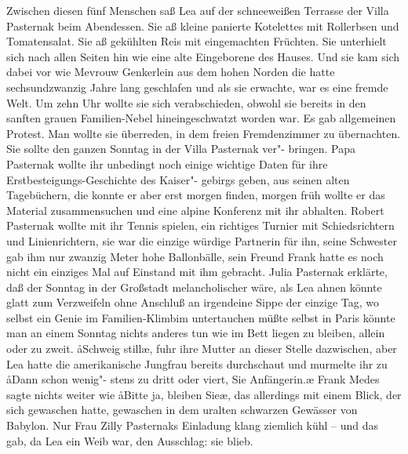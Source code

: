 Zwischen diesen fünf Menschen saß Lea auf der schneeweißen
Terrasse der Villa Pasternak beim Abendessen. Sie aß kleine
panierte Kotelettes mit Rollerbsen und Tomatensalat. Sie
aß gekühlten Reis mit eingemachten Früchten. Sie unterhielt
sich nach allen Seiten hin wie eine alte Eingeborene des
Hauses. Und sie kam sich dabei vor wie Mevrouw Genkerlein
aus dem hohen Norden\dopp{} die hatte sechsundzwanzig Jahre
lang geschlafen und als sie erwachte, war es eine fremde
Welt.
\abstand{}
Um zehn Uhr wollte sie sich verabschieden, obwohl sie bereits
in den sanften grauen Familien-Nebel hineingeschwatzt
worden war. Es gab allgemeinen Protest. Man wollte sie
überreden, in dem freien Fremdenzimmer zu übernachten.
Sie sollte den ganzen Sonntag in der Villa Pasternak ver"-%
bringen. Papa Pasternak wollte ihr unbedingt noch einige
wichtige Daten für ihre Erstbesteigungs-Geschichte des Kaiser"-%
gebirgs geben, aus seinen alten Tagebüchern, die konnte er
aber erst morgen finden, morgen früh wollte er das Material
zusammensuchen und eine alpine Konferenz mit ihr abhalten.
Robert Pasternak wollte mit ihr Tennis spielen, ein richtiges
Turnier mit Schiedsrichtern und Linienrichtern, sie war die
einzige würdige Partnerin für ihn, seine Schwester gab
ihm nur zwanzig Meter hohe Ballonbälle, sein Freund Frank
hatte es noch nicht ein einziges Mal auf Einstand mit ihm
gebracht. Julia Pasternak erklärte, daß der Sonntag in der
Großstadt melancholischer wäre, als Lea ahnen könnte\semi{}
glatt zum Verzweifeln ohne Anschluß an irgendeine Sippe\semi{}
der einzige Tag, wo selbst ein Genie im Familien-Klimbim
untertauchen müßte\semi{} selbst in Paris könnte man an einem
Sonntag nichts anderes tun wie im Bett liegen zu bleiben,
allein oder zu zweit. \aa{}Schweig still\ae{}, fuhr ihre Mutter an dieser
Stelle dazwischen, aber Lea hatte die amerikanische Jungfrau
bereits durchschaut und murmelte ihr zu\dopp{} \aa{}Dann schon wenig"-%
stens zu dritt oder viert, Sie Anfängerin.\ae{} Frank Medes sagte
nichts weiter wie\dopp{} \aa{}Bitte ja, bleiben Sie\ausr{}\ae{}, das allerdings
mit einem Blick, der sich gewaschen hatte, gewaschen in dem
uralten schwarzen Gewässer von Babylon. Nur Frau Zilly
Pasternaks Einladung klang ziemlich kühl -- und das gab, da
Lea ein Weib war, den Ausschlag: sie blieb.

